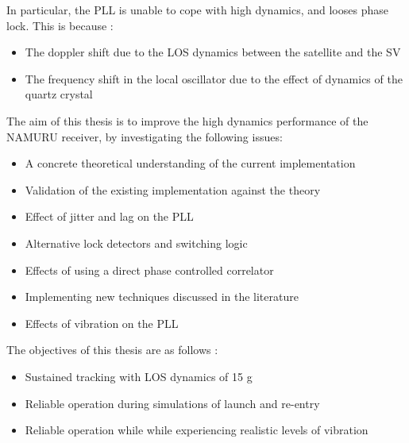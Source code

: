 In particular, the \ac{PLL} is unable to cope with high dynamics, and looses phase lock. This is because : 
\begin{itemize}
\item{The doppler shift due to the \ac{LOS} dynamics between the satellite and the \ac{SV}}
\item{The frequency shift in the local oscillator due to the effect of dynamics of the quartz crystal}
\end{itemize}

The aim of this thesis is to improve the high dynamics performance of the \ac{NAMURU} receiver, by investigating the following issues:  

\begin{itemize}
\item{A concrete theoretical understanding of the current implementation}
\item{Validation of the existing implementation against the theory}
\item{Effect of jitter and lag on the \ac{PLL}}
\item{Alternative lock detectors and switching logic}
\item{Effects of using a direct phase controlled correlator}
\item{Implementing new techniques discussed in the literature}
\item{Effects of vibration on the \ac{PLL}}
\end{itemize}

The objectives of this thesis are as follows : 
\begin{itemize}
\item{Sustained tracking with \ac{LOS} dynamics of 15 g}
\item{Reliable operation during simulations of launch and re-entry}
\item{Reliable operation while while experiencing realistic levels of vibration}
\end{itemize}
